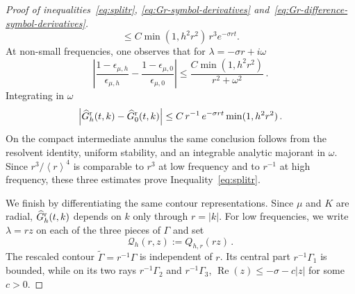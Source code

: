 \documentclass[a4paper,12pt]{amsart} %
\theoremstyle{plain}
\theoremstyle{definition}
\newcommand		{\RR}		{\mathbb R}			%
\newcommand		{\R}		{\RR}
\newcommand		{\lt}			{\left}				%
\newcommand		{\rt}			{\right}			%
\renewcommand	{\(}			{\lt(}
\renewcommand	{\)}			{\rt)}
\newcommand		{\bangle}[1]	{\lt\langle #1\rt\rangle}
\newcommand		{\weight}[1]	{\bangle{#1}}	%
\newcommand		{\n}[1]			{\lt\lvert{#1}\rt\rvert}	%
\renewcommand		{\d}		{\mathop{}\!\mathrm{d}}		%
\DeclareMathOperator{\re}		{Re}				%
\renewcommand	{\Re}[1]		{\re\!\( #1 \)}		%
\newcommand	{\h}			{h}
\newcommand		{\hatG}			{\widehat{G}}
\newcommand		{\hatGr}		{\hatG^{\textnormal{r}}}
\begin{document}
\begin{proof}[Proof of inequalities~\eqref{eq:splitr}, \eqref{eq:Gr-symbol-derivatives} and~\eqref{eq:Gr-difference-symbol-derivatives}]
\begin{equation*}
			\leq C \min(1, h^2r^2)\, r^3 e^{-\sigma rt}.
		\end{equation*}
		At non-small frequencies, one observes that for $\lambda = - \sigma r + i\omega$
		\begin{equation*}
			\n{\frac{1-\epsilon_{\mu,\h}}{\epsilon_{\mu,\h}} - \frac{1-\epsilon_{\mu,0}}{\epsilon_{\mu,0}}} \leq \frac{C\min(1,h^2r^2)}{r^2+\omega^2} \, .
		\end{equation*}
		Integrating in $\omega$ %
		\begin{equation*}
			\n{\hatGr_\h(t,k)-\hatGr_0(t,k)}
			\leq C \, r^{-1} \, e^{-\sigma rt} \min(1,h^2 r^2) \, .
		\end{equation*}
		On the compact intermediate annulus the same conclusion follows from the resolvent identity, uniform stability, and an integrable analytic majorant in $\omega$. Since $r^3/\weight{r}^4$ is comparable to $r^3$ at low frequency and to $r^{-1}$ at high frequency, these three estimates prove Inequality~\eqref{eq:splitr}.

		We finish by differentiating the same contour representations. Since $\mu$ and $K$ are radial, $\hatGr_\h(t,k)$ depends on $k$ only through $r=\n{k}$. For low frequencies, we write $\lambda=rz$ on each of the three pieces of $\Gamma$ and set
		\begin{equation*}
			\mathscr Q_\h(r,z):=Q_{\h,r}(rz) \, .
		\end{equation*}
		The rescaled contour $\widetilde\Gamma=r^{-1}\Gamma$ is independent of $r$. Its central part $r^{-1} \Gamma_1$ is bounded, while on its two rays $r^{-1} \Gamma_2$ and $r^{-1} \Gamma_3$, $\Re z\leq-\sigma - c\n{z}$ for some $c>0$.


\end{proof}
\end{document}
